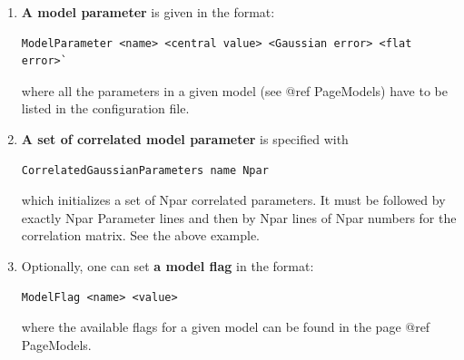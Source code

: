 \documentclass[preprint,3p,12pt]{elsarticle}
\begin{document}
{\begin{enumerate}
\item  {\bf A model parameter} is given in the format:
\begin{lstlisting}
ModelParameter <name> <central value> <Gaussian error> <flat error>`
\end{lstlisting}
where all the parameters in a given model (see @ref PageModels) have
  to be listed in the configuration file.

\item {\bf A set of correlated model parameter} is specified with 
\begin{lstlisting}
CorrelatedGaussianParameters name Npar
\end{lstlisting}
   which initializes a set of Npar correlated parameters. It must be
   followed by exactly Npar Parameter lines and then by Npar lines of
   Npar numbers for the correlation matrix. See the above example.

\item  Optionally, one can set {\bf a model flag} in the format:

\begin{lstlisting}
ModelFlag <name> <value>
\end{lstlisting}

  where the available flags for a given model can be found in the page
  @ref PageModels.


\end{enumerate}}
\end{document}
